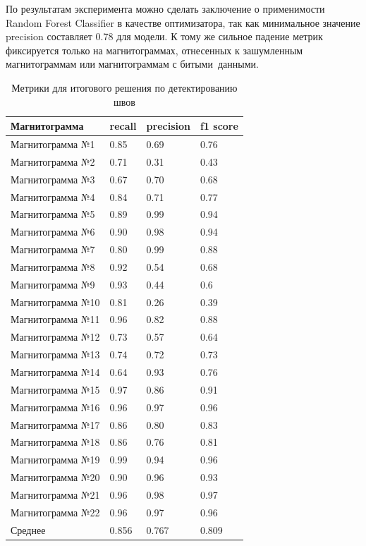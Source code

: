 \documentclass[a4paper,article,14pt]{extarticle}
\begin{document}
По результатам эксперимента можно сделать заключение о применимости Random Forest Classifier в качестве 
оптимизатора, так как минимальное значение precision составляет 0.78 для модели. К тому же сильное 
падение метрик фиксируется только на магнитограммах, отнесенных к зашумленным магнитограммам или 
магнитограммам с \flqq битыми\frqq\, данными.

\begin{center}
    \begin{longtable}{|p{5cm}|p{3cm}|p{3cm}|p{3cm}|}
        \caption{Метрики для итогового решения по детектированию швов}\\\hline
        Магнитограмма & recall & precision & f1 score \\ \hline
        Магнитограмма №1 & 0.85 & 0.69 & 0.76 \\ \hline
        Магнитограмма №2 & 0.71 & 0.31 & 0.43 \\ \hline
        Магнитограмма №3 & 0.67 & 0.70 & 0.68 \\ \hline
        Магнитограмма №4 & 0.84 & 0.71 & 0.77 \\ \hline
        Магнитограмма №5 & 0.89 & 0.99 & 0.94 \\ \hline
        Магнитограмма №6 & 0.90 & 0.98 & 0.94 \\ \hline
        Магнитограмма №7 & 0.80 & 0.99 & 0.88 \\ \hline
        Магнитограмма №8 & 0.92 & 0.54 & 0.68 \\ \hline
        Магнитограмма №9 & 0.93 & 0.44 & 0.6 \\ \hline
        Магнитограмма №10 & 0.81 & 0.26 & 0.39 \\ \hline
        Магнитограмма №11 & 0.96 & 0.82 & 0.88 \\ \hline
        Магнитограмма №12 & 0.73 & 0.57 & 0.64 \\ \hline
        Магнитограмма №13 & 0.74 & 0.72 & 0.73 \\ \hline
        Магнитограмма №14 & 0.64 & 0.93 & 0.76 \\ \hline
        Магнитограмма №15 & 0.97 & 0.86 & 0.91 \\ \hline
        Магнитограмма №16 & 0.96 & 0.97 & 0.96 \\ \hline
        Магнитограмма №17 & 0.86 & 0.80 & 0.83 \\ \hline
        Магнитограмма №18 & 0.86 & 0.76 & 0.81 \\ \hline
        Магнитограмма №19 & 0.99 & 0.94 & 0.96 \\ \hline
        Магнитограмма №20 & 0.90 & 0.96 & 0.93 \\ \hline
        Магнитограмма №21 & 0.96 & 0.98 & 0.97 \\ \hline
        Магнитограмма №22 & 0.96 & 0.97 & 0.96 \\ \hline
        Среднее & 0.856 & 0.767 & 0.809 \\ \hline
    \end{longtable}
\end{center}
\end{document}
